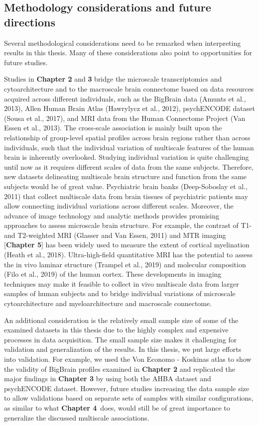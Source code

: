 \begin{refsection}
\subsection*{Methodology considerations and future directions}
Several methodological considerations need to be remarked when interpreting results in this thesis. Many of these considerations also point to opportunities for future studies.

Studies in \textbf{Chapter 2} and \textbf{3} bridge the microscale transcriptomics and cytoarchitecture and to the macroscale brain connectome based on data resources acquired across different individuals, such as the BigBrain data (Amunts et al., 2013), Allen Human Brain Atlas (Hawrylycz et al., 2012), psychENCODE dataset (Sousa et al., 2017), and MRI data from the Human Connectome Project (Van Essen et al., 2013). The cross-scale association is mainly built upon the relationship of group-level spatial profiles across brain regions rather than across individuals, such that the individual variation of multiscale features of the human brain is inherently overlooked. Studying individual variation is quite challenging until now as it requires different scales of data from the same subjects. Therefore, new datasets delineating multiscale brain structure and function from the same subjects would be of great value. Psychiatric brain banks (Deep-Soboslay et al., 2011) that collect multiscale data from brain tissues of psychiatric patients may allow connecting individual variations across different scales. Moreover, the advance of image technology and analytic methods provides promising approaches to assess microscale brain structure. For example, the contrast of T1- and T2-weighted MRI (Glasser and Van Essen, 2011) and MTR imaging [\textbf{Chapter 5}] has been widely used to measure the extent of cortical myelination (Heath et al., 2018). Ultra-high-field quantitative MRI has the potential to assess the in vivo laminar structure (Trampel et al., 2019) and molecular composition (Filo et al., 2019) of the human cortex. These developments in imaging techniques may make it feasible to collect in vivo multiscale data from larger samples of human subjects and to bridge individual variations of microscale cytoarchitecture and myeloarchitecture and macroscale connectome.

An additional consideration is the relatively small sample size of some of the examined datasets in this thesis due to the highly complex and expensive processes in data acquisition. The small sample size makes it challenging for validation and generalization of the results. In this thesis, we put large efforts into validation. For example, we used the Von Economo - Koskinas atlas to show the validity of BigBrain profiles examined in \textbf{Chapter 2} and replicated the major findings in \textbf{Chapter 3} by using both the AHBA dataset and psychENCODE dataset. However, future studies increasing the data sample size to allow validations based on separate sets of samples with similar configurations, as similar to what \textbf{Chapter 4}\ does, would still be of great importance to generalize the discussed multiscale associations. 


\end{refsection}
